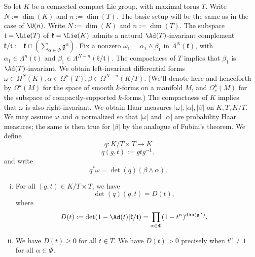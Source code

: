 \documentclass[reqno]{amsart} 
\begin{document}
So let $K$ be a connected compact Lie group, with maximal torus $T$.  Write $N := \dim(K)$ and $n := \dim(T)$.  The basic setup will be the same as in the case of $\U(n)$.  Write $N := \dim(K)$ and $n := \dim(T)$.  The subspace $\mathfrak{t} = \Lie(T)$ of $\mathfrak{k} = \Lie(K)$ admits a natural $\Ad(T)$-invariant complement $\mathfrak{k}/\mathfrak{t} := \mathfrak{k} \cap (\sum_{\alpha \in \Phi} \mathfrak{g}^{\alpha})$.  Fix a nonzero $\omega_1 = \alpha_1 \wedge \beta_1$ in $\Lambda^N(\mathfrak{k})$, with $\alpha_1 \in \Lambda^{n}(\mathfrak{t})$ and $\beta_1 \in \Lambda^{N-n}(\mathfrak{k}/\mathfrak{t})$.  The compactness of $T$ implies that $\beta_1$ is $\Ad(T)$-invariant.  We obtain left-invariant differential forms $\omega \in \Omega^N(K), \alpha \in \Omega^n(T), \beta \in \Omega^{N-n}(K/T)$.  (We'll denote here and henceforth by $\Omega^k(M)$ for the space of smooth $k$-forms on a manifold $M$, and $\Omega_c^k(M)$ for the subspace of compactly-supported $k$-forms.)  The compactness of $K$ implies that $\omega$ is also right-invariant.  We obtain Haar measures $|\omega|,|\alpha|,|\beta|$ on $K, T, K/T$.  We may assume $\omega$ and $\alpha$ normalized so that $|\omega|$ and $|\alpha|$ are probability Haar measures; the same is then true for $|\beta|$ by the analogue of Fubini's theorem.  We define
\begin{equation*}
  q : K/T \times T \rightarrow K
\end{equation*}
\begin{equation*}
  q(g, t) := g t g^{-1},
\end{equation*}
and write
\begin{equation*}
  q^* \omega = \det(q) (\beta \wedge \alpha).
\end{equation*}
\begin{lemma}\label{lem:jacobian-computation-WIF-general}
  \begin{enumerate}
[(i)]
  \item For all $(g, t) \in K/T \times T$, we have
    \begin{equation*}
      \det(q)(g,t) = D(t),
    \end{equation*}
    where
    \begin{equation*}
      D(t) := \det(1 - \Ad(t) | \mathfrak{k}/\mathfrak{t}) = \prod_{\alpha \in \Phi} (1 - t^\alpha)^{\dim(\mathfrak{g}^\alpha)}.
    \end{equation*}
  \item We have $D(t) \geq 0$ for all $t \in T$.  We have $D(t) > 0$ precisely when $t^\alpha \neq 1$ for all $\alpha \in \Phi$.
  \end{enumerate}
\end{lemma}
\end{document}
